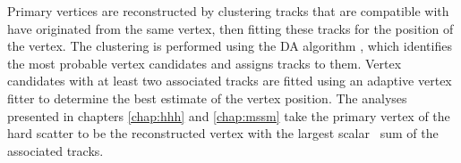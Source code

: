 \enlargethispage{\baselineskip}
Primary vertices are reconstructed by clustering
tracks that are compatible with have originated from the same vertex, then fitting 
these tracks for the position of the vertex. The clustering 
is performed using the \ac{DA} algorithm \cite{vtx-da}, which identifies
the most probable vertex candidates and assigns tracks to them. Vertex
candidates with at least two associated tracks are fitted using an adaptive
vertex fitter \cite{vtx-adaptivefit} to determine the best estimate of the 
vertex position. The analyses presented in chapters \ref{chap:hhh} and \ref{chap:mssm} take the primary
vertex of the hard scatter to be the reconstructed vertex with the largest scalar \pT~sum of the associated
tracks. %

